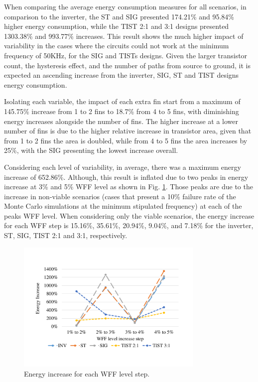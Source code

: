 \documentclass[diss,pgmicro,english]{iiufrgs}
\begin{document}
When comparing the average energy consumption measures for all scenarios, in comparison to the inverter, the ST and SIG presented 174.21\% and 95.84\% higher energy consumption, while the TIST 2:1 and 3:1 designs presented 1303.38\% and 993.77\% increases. This result shows the much higher impact of variability in the cases where the circuits could not work at the minimum frequency of 50KHz, for the SIG and TISTs designs. Given the larger transistor count, the hysteresis effect, and the number of paths from source to ground, it is expected an ascending increase from the inverter, SIG, ST and TIST designs energy consumption.

Isolating each variable, the impact of each extra fin start from a maximum of 145.75\% increase from 1 to 2 fins to 18.7\% from 4 to 5 fins, with diminishing energy increases alongside the number of fins. The higher increase at a lower number of fins is due to the higher relative increase in transistor area, given that from 1 to 2 fins the area is doubled, while from 4 to 5 fins the area increases by 25\%, with the SIG presenting the lowest increase overall.

Considering each level of variability, in average, there was a maximum energy increase of 652.86\%. Although, this result is inflated due to two peaks in energy increase at 3\% and 5\% WFF level as shown in Fig. \ref{fig:energyWFFstep}. Those peaks are due to the increase in non-viable scenarios (cases that present a 10\% failure rate of the Monte Carlo simulations at the minimum stipulated frequency) at each of the peaks WFF level. When considering only the viable scenarios, the energy increase for each WFF step is 15.16\%, 35.61\%, 20.94\%, 9.04\%, and 7.18\% for the inverter, ST, SIG, TIST 2:1 and 3:1, respectively.

\begin{figure}[h]
	\centering
		\includegraphics[width=0.8\textwidth, trim={2cm 3cm 2cm 3cm}, clip]{energyIncreaseWFFstep.pdf}
		\caption{Energy increase for each WFF level step.}
	\label{fig:energyWFFstep}
\end{figure}
\end{document}
